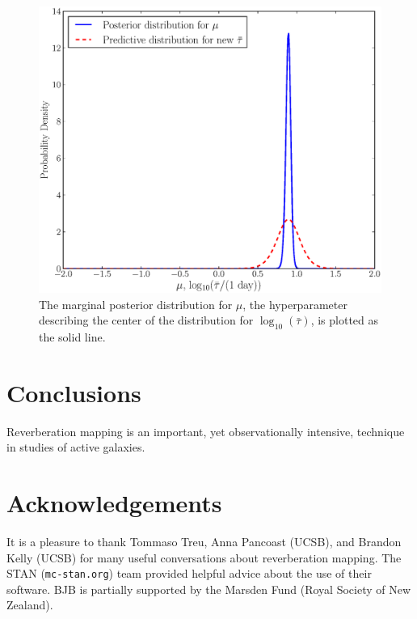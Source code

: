 \documentclass[useAMS,usenatbib]{mn2e}
\begin{document}
\begin{figure}
\begin{center}
\includegraphics[scale=0.35]{Figures/posterior2.eps}
\caption{The marginal posterior distribution for $\mu$, the 
hyperparameter describing the center of the distribution for
$\log_{10}\left(\bar{\tau}\right)$, is plotted as the solid line.
\label{fig:posterior2}}
\end{center}
\end{figure}

\section{Conclusions}
Reverberation mapping is an important, yet observationally intensive, technique
in studies of active galaxies.


\section*{Acknowledgements}
It is a pleasure to thank Tommaso Treu, Anna Pancoast (UCSB), and
Brandon Kelly (UCSB) for many
useful conversations about reverberation mapping. The STAN ({\tt mc-stan.org})
team provided helpful advice about the use of their software. BJB is partially
supported by the Marsden Fund (Royal Society of New Zealand).
\end{document}
